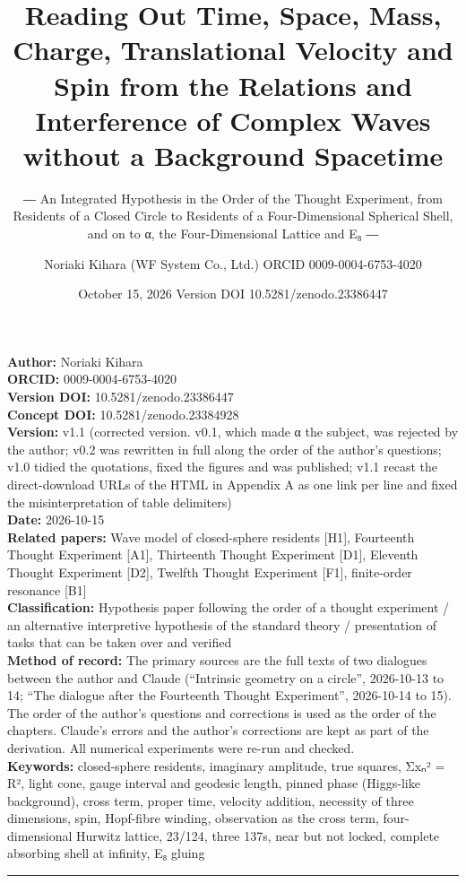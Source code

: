 \documentclass[
  a4paper,
]{article}
\title{Reading Out Time, Space, Mass, Charge, Translational Velocity and
Spin from the Relations and Interference of Complex Waves without a
Background Spacetime}
\subtitle{― An Integrated Hypothesis in the Order of the Thought
Experiment, from Residents of a Closed Circle to Residents of a
Four-Dimensional Spherical Shell, and on to α, the Four-Dimensional
Lattice and E₈ ―}
\author{Noriaki Kihara (WF System Co., Ltd.) ORCID 0009-0004-6753-4020}
\date{October 15, 2026 Version DOI 10.5281/zenodo.23386447}
\begin{document}
\maketitle

\textbf{Author:} Noriaki Kihara\\
\textbf{ORCID:} 0009-0004-6753-4020\\
\textbf{Version DOI:} 10.5281/zenodo.23386447\\
\textbf{Concept DOI:} 10.5281/zenodo.23384928\\
\textbf{Version:} v1.1 (corrected version. v0.1, which made α the
subject, was rejected by the author; v0.2 was rewritten in full along
the order of the author's questions; v1.0 tidied the quotations, fixed
the figures and was published; v1.1 recast the direct-download URLs of
the HTML in Appendix A as one link per line and fixed the
misinterpretation of table delimiters)\\
\textbf{Date:} 2026-10-15\\
\textbf{Related papers:} Wave model of closed-sphere residents {[}H1{]},
Fourteenth Thought Experiment {[}A1{]}, Thirteenth Thought Experiment
{[}D1{]}, Eleventh Thought Experiment {[}D2{]}, Twelfth Thought
Experiment {[}F1{]}, finite-order resonance {[}B1{]}\\
\textbf{Classification:} Hypothesis paper following the order of a
thought experiment / an alternative interpretive hypothesis of the
standard theory / presentation of tasks that can be taken over and
verified\\
\textbf{Method of record:} The primary sources are the full texts of two
dialogues between the author and Claude (``Intrinsic geometry on a
circle'', 2026-10-13 to 14; ``The dialogue after the Fourteenth Thought
Experiment'', 2026-10-14 to 15). The order of the author's questions and
corrections is used as the order of the chapters. Claude's errors and
the author's corrections are kept as part of the derivation. All
numerical experiments were re-run and checked.\\
\textbf{Keywords:} closed-sphere residents, imaginary amplitude, true
squares, Σxₙ² = R², light cone, gauge interval and geodesic length,
pinned phase (Higgs-like background), cross term, proper time, velocity
addition, necessity of three dimensions, spin, Hopf-fibre winding,
observation as the cross term, four-dimensional Hurwitz lattice, 23/124,
three 137s, near but not locked, complete absorbing shell at infinity,
E₈ gluing

\begin{center}\rule{0.5\linewidth}{0.5pt}\end{center}
\end{document}
